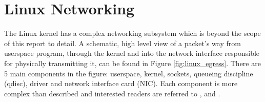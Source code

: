 \section{Linux Networking}

The Linux kernel has a complex networking subsystem which is beyond the scope
of this report to detail. A schematic, high level view of a packet's way from 
userspace program, through the kernel and into the network interface responsible 
for physically transmitting it, can be found in Figure \ref{fig:linux_egress}. 
There are 5 main components in the figure: userspace, kernel, sockets, queueing 
discipline (qdisc), driver and network interface card (NIC). Each component is
more complex than described and interested readers are referred to \cite{knet},
\cite{pcsending} and \cite[Chapter~17]{ldd}.

